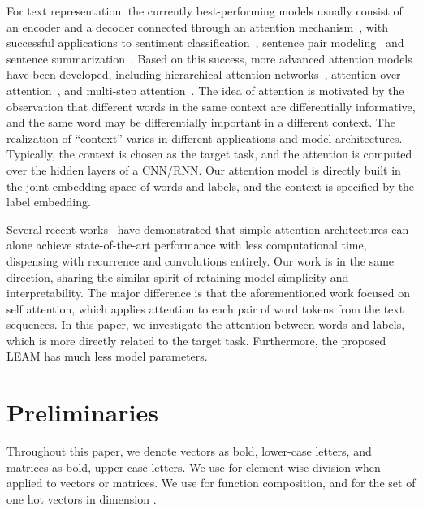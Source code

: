 \documentclass[11pt,a4paper]{article}
\begin{document}
For text representation, the currently best-performing models usually consist of an encoder and a decoder connected through an attention mechanism~\cite{vaswani2017attention,bahdanau2015neural}, with successful applications to sentiment classification~\cite{zhou2016attention}, sentence pair modeling~\cite{yin2016abcnn} and sentence summarization~\cite{rush2015neural}. Based on this success, more advanced attention models have been developed, including hierarchical attention networks~\cite{yang2016hierarchical}, attention over attention~\cite{cui2016attention}, and multi-step attention~\cite{gehring2017convolutional}.
The idea of attention is motivated by the observation that different words in the same context are differentially informative, and the same word may be differentially important in a different context. The realization of ``context'' varies in different applications and model architectures. Typically, the context is chosen as the target task, and the attention is computed over the hidden layers of a CNN/RNN. 
Our attention model is directly built in the joint embedding space of words and labels, and the context is specified by the label embedding.

Several recent works~\cite{vaswani2017attention,shen2018disan,shen2018bi} have demonstrated that simple attention architectures can alone achieve state-of-the-art performance with less computational time, dispensing with recurrence and convolutions entirely. Our work is in the same direction, sharing the similar spirit of retaining model simplicity and interpretability. The major difference is that the aforementioned work focused on self attention, which applies attention to each pair of word tokens from the text sequences. In this paper, we investigate the attention between words and labels, which is more directly related to the target task. Furthermore, the proposed LEAM has much less model parameters. 


\section{Preliminaries}
Throughout this paper, we denote vectors as bold, lower-case letters, and matrices as bold, upper-case
letters. We use  for element-wise division when applied to vectors or matrices. We use  for function composition, and  for the set of one hot vectors in dimension .
\end{document}
